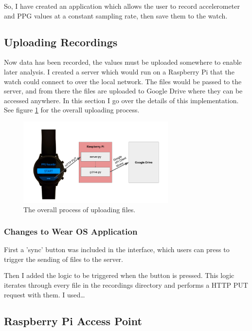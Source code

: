 \documentclass[12pt,a4paper,twoside,openright]{report}
\begin{document}
So, I have created an application which allows the user to record
accelerometer and PPG values at a constant sampling rate, then save them to
the watch.

\subsection{Uploading Recordings}

Now data has been recorded, the values must be uploaded somewhere to enable
later analysis. I created a server which would run on a Raspberry Pi that the
watch could connect to over the local network. The files would be passed to
the server, and from there the files are uploaded to Google Drive where they
can be accessed anywhere. In this section I go over the details of this
implementation. See figure \ref{fig:upload} for the overall uploading process.

\begin{figure}[tbh]
	\centerline{\includegraphics[width=0.7\textwidth]{figs/upload.png}}
	\caption{The overall process of uploading files.}
	\label{fig:upload}
\end{figure}

\subsubsection{Changes to Wear OS Application}

First a 'sync' button was included in the interface, which users can press to
trigger the sending of files to the server.

Then I added the logic to be triggered when the button is pressed. This logic
iterates through every file in the recordings directory and performs a HTTP
PUT request with them. I used\ldots

\subsection{Raspberry Pi Access Point}
\end{document}
